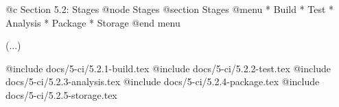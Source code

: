 @c Section 5.2: Stages
@node Stages
@section Stages
@menu
* Build
* Test
* Analysis
* Package
* Storage
@end menu

(...)

@include docs/5-ci/5.2.1-build.tex
@include docs/5-ci/5.2.2-test.tex
@include docs/5-ci/5.2.3-analysis.tex
@include docs/5-ci/5.2.4-package.tex
@include docs/5-ci/5.2.5-storage.tex
